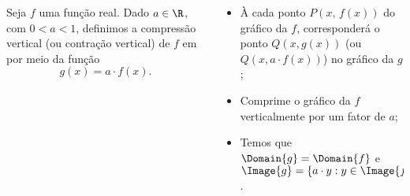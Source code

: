 \begin{frame}
  \begin{columns}[onlytextwidth]
    \begin{column}{0.49\textwidth}\vspace*{-0.5cm}
      \begin{definition}
        Seja $f$ uma função real. Dado $a\in\R$, com $0<a<1$, definimos a compressão vertical (ou contração vertical) de $f$ em por meio da função
        \begin{equation*}
          g(x) = a\cdot f(x).
        \end{equation*}
      \end{definition}
    \end{column}
    \begin{column}{0.49\textwidth}\vspace*{-0.6cm}
      \begin{itemize}
        \item À cada ponto $P(x,\,f(x))$ do gráfico da $f$, corresponderá o ponto $Q(x,g(x))$ (ou $Q(x,a\cdot f(x))$) no gráfico da $g$;
        \item Comprime o gráfico da $f$ verticalmente por um fator de $a$;
        \item Temos que $\Domain{g} = \Domain{f}$ e $\Image{g}=\{a\cdot y:y\in\Image{f}\}$.
      \end{itemize}
    \end{column}
  \end{columns}
  \vspace*{-0.5cm}
  \begin{figure}
  \end{figure}
\end{frame}

